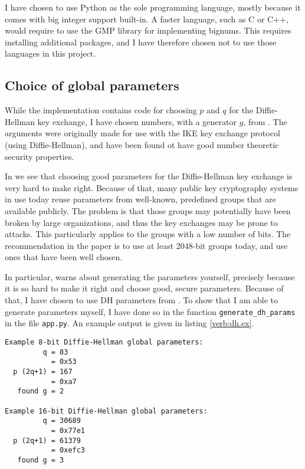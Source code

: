 \documentclass[a4paper,english,12pt]{article}
\begin{document}
I have chosen to use Python as the sole programming language, mostly because it
comes with big integer support built-in. A faster language, such as C or C++,
would require to use the GMP library \cite{wiki:gmp} for implementing bignums.
This requires installing additional packages, and I have therefore chosen not
to use those languages in this project.

\subsection{Choice of global parameters}
While the implementation contains code for choosing $p$ and $q$ for the
Diffie-Hellman key exchange, I have chosen numbers, with a generator $g$, from
\cite{rfc3526}. The arguments were originally made for use with the IKE key
exchange protocol (using Diffie-Hellman), and have been found ot have good
number theoretic security properties.

In \cite{dh.params} we see that choosing good parameters for the Diffie-Hellman
key exchange is very hard to make right. Because of that, many public key
cryptography systems in use today reuse parameters from well-known, predefined
groups that are available publicly. The problem is that those groups may
potentially have been broken by large organizations, and thus the key exchanges
may be prone to attacks. This particularly applies to the groups with a low
number of bits. The recommendation in the paper is to use at least 2048-bit
groups today, and use ones that have been well chosen. 

In particular, \cite{dh.params} warns about generating the parameters yourself,
precisely because it is so hard to make it right and choose good, secure
parameters. Because of that, I have chosen to use DH parameters from
\cite{rfc3526}. To show that I am able to generate parameters myself, I have
done so in the function \texttt{generate\_dh\_params} in the file
\texttt{app.py}. An example output is given in listing \vref{verb:dh.ex}.

\begin{lstlisting}[caption={Finding Diffie-Hellman parameters}, label=verb:dh.ex]
Example 8-bit Diffie-Hellman global parameters:
         q = 83
           = 0x53
  p (2q+1) = 167
           = 0xa7
   found g = 2

Example 16-bit Diffie-Hellman global parameters:
         q = 30689
           = 0x77e1
  p (2q+1) = 61379
           = 0xefc3
   found g = 3
\end{lstlisting}
\end{document}
